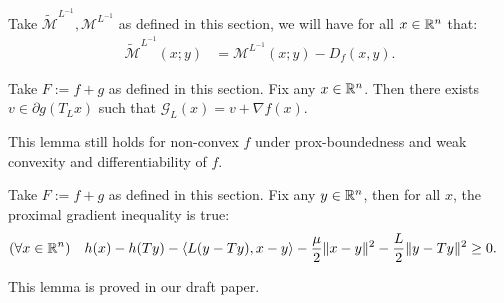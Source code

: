 \documentclass[12pt]{article}
\begin{document}
            \begin{lemma}\;\\
                Take $\widetilde{\mathcal M}^{L^{-1}}, \mathcal M^{L^{-1}}$ as defined in this section, we will have for all $x \in \mathbb R^n$ that: 
                \begin{align*}
                    \widetilde{\mathcal M}^{L^{-1}}(x; y)
                    &= 
                    \mathcal M^{L^{-1}}(x; y)- D_f(x, y).
                \end{align*}
            \end{lemma}
            \begin{lemma}
                Take $F:= f + g$ as defined in this section. 
                Fix any $x \in \mathbb R^n$. 
                Then there exists $v \in \partial g(T_L x)$ such that $\mathcal G_L (x) = v + \nabla f(x)$. 
            \end{lemma}
            \begin{remark}
                This lemma still holds for non-convex $f$ under prox-boundedness and weak convexity and differentiability of $f$. 
            \end{remark}
            \begin{lemma}\label{thm:prox-grad-ineq}
                Take $F:= f + g$ as defined in this section. 
                Fix any $y \in \mathbb R^n$, then for all $x$, the proximal gradient inequality is true: 
                \begin{align*}
                    (\forall x \in \mathbb R^n)\quad 
                    h(x)  - h(Ty) - \langle L(y - Ty), x - y\rangle
                    - \frac{\mu}{2}\Vert x - y\Vert^2 - \frac{L}{2}\Vert y - Ty\Vert^2 
                    &\ge 0. 
                \end{align*}
            \end{lemma}
            \begin{remark}
                This lemma is proved in our draft paper. 
            \end{remark}
\end{document}
